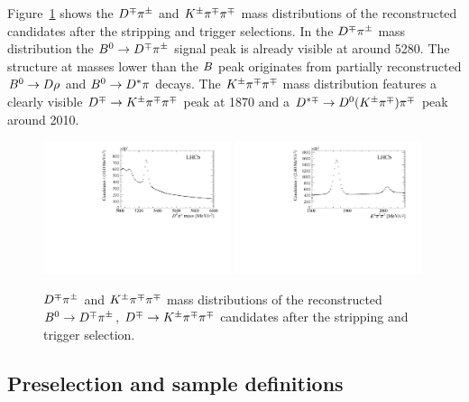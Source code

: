 Figure~\ref{fig:mB_mD_after_stripping} shows the $D^\mp\pi^\pm$ and $K^{\pm}\pi^\mp\pi^\mp$ mass
distributions of the reconstructed candidates after the stripping and trigger
selections. In the $D^\mp\pi^\pm$ mass distribution the $B^0\rightarrow D^\mp\pi^\pm$ signal peak is already visible at
around \SI{5280}{\MeVcc}. The structure at masses lower than the $B$ peak originates from
partially reconstructed $B^0\rightarrow D\rho$ and $B^0\rightarrow D^*\pi$ decays. The $K^{\pm}\pi^\mp\pi^\mp$
mass distribution features a clearly visible $D^\mp\rightarrow K^{\pm}\pi^\mp\pi^\mp$ peak at \SI{1870}{\MeVcc} and
a $D^{*\mp}\rightarrow D^0(K^\pm\pi^\mp)\pi^\mp$ peak around \SI{2010}{\MeVcc}.
%
\begin{figure}[t]
	\begin{center}
		\includegraphics[width=0.49\textwidth]{02Selection/figs/Bmass_afterStrippingAndTrigger.pdf}
		\includegraphics[width=0.49\textwidth]{02Selection/figs/Dmass_afterStrippingAndTrigger.pdf}
	\end{center}
        \vspace{-2mm}
	\caption{$D^\mp\pi^\pm$ and $K^{\pm}\pi^\mp\pi^\mp$ mass distributions of the reconstructed $B^0\rightarrow D^\mp\pi^\pm$, $D^\mp\rightarrow K^{\pm}\pi^\mp\pi^\mp$ candidates
	after the stripping and trigger selection.}
	\label{fig:mB_mD_after_stripping}
\end{figure}

\subsection{Preselection and sample definitions}
\label{sec:preselection}

